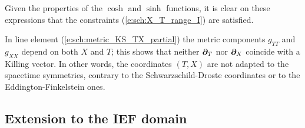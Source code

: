 \begin{remark}
Given the properties of the $\cosh$ and $\sinh$ functions, it is clear on these
expressions that the constraints (\ref{e:sch:X_T_range_I}) are satisfied.
\end{remark}
\begin{remark}
In line element (\ref{e:sch:metric_KS_TX_partial})
the metric components $g_{TT}$ and $g_{XX}$ depend on both $X$ and $T$; this
shows that neither $\bm{\partial}_T$ nor $\bm{\partial}_X$ coincide with a Killing vector.
In other words, the coordinates $(T,X)$ are not adapted to the spacetime
symmetries, contrary to the Schwarzschild-Droste coordinates or to the
Eddington-Finkelstein ones.
\end{remark}

\subsection{Extension to the IEF domain}

